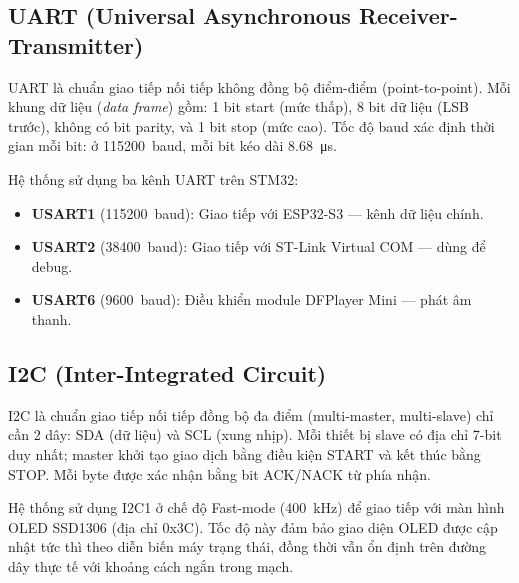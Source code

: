 \subsection{UART (Universal Asynchronous Receiver-Transmitter)}

UART là chuẩn giao tiếp nối tiếp không đồng bộ điểm-điểm (point-to-point). Mỗi khung dữ liệu (\textit{data frame}) gồm: 1 bit start (mức thấp), 8 bit dữ liệu (LSB trước), không có bit parity, và 1 bit stop (mức cao). Tốc độ baud xác định thời gian mỗi bit: ở \SI{115200}{baud}, mỗi bit kéo dài \SI{8.68}{\micro\second}.

Hệ thống sử dụng ba kênh UART trên STM32:
\begin{itemize}
  \item \textbf{USART1} (\SI{115200}{baud}): Giao tiếp với ESP32-S3 --- kênh dữ liệu chính.
  \item \textbf{USART2} (\SI{38400}{baud}): Giao tiếp với ST-Link Virtual COM --- dùng để debug.
  \item \textbf{USART6} (\SI{9600}{baud}): Điều khiển module DFPlayer Mini --- phát âm thanh.
\end{itemize}

\subsection{I2C (Inter-Integrated Circuit)}

I2C là chuẩn giao tiếp nối tiếp đồng bộ đa điểm (multi-master, multi-slave) chỉ cần 2 dây: SDA (dữ liệu) và SCL (xung nhịp). Mỗi thiết bị slave có địa chỉ 7-bit duy nhất; master khởi tạo giao dịch bằng điều kiện START và kết thúc bằng STOP. Mỗi byte được xác nhận bằng bit ACK/NACK từ phía nhận.

Hệ thống sử dụng I2C1 ở chế độ Fast-mode (\SI{400}{kHz}) để giao tiếp với màn hình OLED SSD1306 (địa chỉ 0x3C). Tốc độ này đảm bảo giao diện OLED được cập nhật tức thì theo diễn biến máy trạng thái, đồng thời vẫn ổn định trên đường dây thực tế với khoảng cách ngắn trong mạch.

